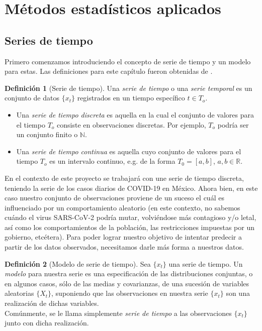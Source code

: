 \documentclass[11pt,letterpaper]{article}
\theoremstyle{definition}
\newtheorem{definition}{Definición}[section]
\theoremstyle{theorem}
\theoremstyle{remark}
\begin{document}
	\section{Métodos estadísticos aplicados}
	\subsection{Series de tiempo}
	\noindent\justify Primero comenzamos introduciendo el concepto de serie de tiempo y un modelo para estas. Las definiciones para este capítulo fueron obtenidas de \autocite{brockwelldavis}.
	\begin{definition}[Serie de tiempo] \label{defSerieTemporal}
		Una \textit{serie de tiempo} o una \textit{serie temporal} es un conjunto de datos \(\{x_t\}\) registrados en un tiempo específico \(t\in T_o\).
		\begin{itemize}
			\item Una \textit{serie de tiempo discreta} es aquella en la cual el conjunto de valores para el tiempo \(T_o\) consiste en observaciones discretas. Por ejemplo, \(T_o\) podría ser un conjunto finito o \(\mathbb{N} \).
			\item Una \textit{serie de tiempo continua} es aquella cuyo conjunto de valores para el tiempo \(T_o\) es un intervalo continuo, e.g. de la forma \(T_0=[a,b]\), \(a,b\in\mathbb{R}\).
		\end{itemize}
	\end{definition}
	En el contexto de este proyecto se trabajará con une serie de tiempo discreta, teniendo la serie de los casos diarios de COVID-19 en México. Ahora bien, en este caso nuestro conjunto de observaciones proviene de un suceso el cuál es influenciado por un comportamiento aleatorio (en este contexto, no sabemos cuándo el virus SARS-CoV-2 podría mutar, volviéndose más contagioso y/o letal, así como los comportamientos de la población, las restricciones impuestas por un gobierno, etcétera). Para poder lograr nuestro objetivo de intentar predecir a partir de los datos observados, necesitamos darle más forma a nuestros datos.
	\begin{definition}[Modelo de serie de tiempo]
		Sea \(\{x_t\}\) una serie de tiempo. Un \textit{modelo} para nuestra serie es una especificación de las distribuciones conjuntas, o en algunos casos, sólo de las medias y covarianzas, de una sucesión de variables aleatorias \(\{X_t\}\), suponiendo que las observaciones en nuestra serie \(\{x_t\}\) son una realización de dichas variables. \\
		Comúnmente, se le llama simplemente \textit{serie de tiempo} a las observaciones \(\{x_t\}\) junto con dicha realización.
	\end{definition}
\end{document}
